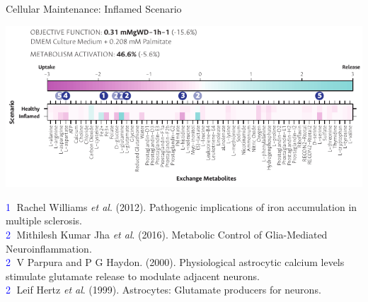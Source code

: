 \documentclass[11pt]{beamer}
\begin{document}
\begin{frame}{Cellular Maintenance: Inflamed Scenario}
\begin{center}
\includegraphics[width=\textwidth]{I-results}\\
\end{center}
\textcolor{blue}{\textcircled{{\tiny 1}}} {\tiny Rachel Williams \textit{et al}. (2012). Pathogenic implications of iron accumulation in multiple sclerosis.\vspace{0.3cm}\\}\pause
\textcolor{blue}{\textcircled{{\tiny 2}}} {\tiny Mithilesh Kumar Jha \textit{et al}. (2016). Metabolic Control of Glia-Mediated Neuroinflammation.\vspace{0.1cm}\\}
\textcolor{blue}{\textcircled{{\tiny 2}}} {\tiny V Parpura and P G Haydon. (2000). Physiological astrocytic calcium levels stimulate glutamate release to modulate adjacent neurons.\vspace{0.1cm}\\}
\textcolor{blue}{\textcircled{{\tiny 2}}} {\tiny Leif Hertz \textit{et al}. (1999). Astrocytes: Glutamate producers for neurons.\vspace{0.1cm}\\}
\end{frame}
\end{document}
